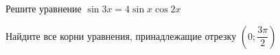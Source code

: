\begin{ex}
	\begin{condition}
		\begin{enumcols}[label=\asbuk*)]
			\item Решите уравнение \( \sin 3x =4\sin x\cos 2x \)
			\item Найдите все корни уравнения, принадлежащие отрезку \( \left(0;\dfrac{3\pi}{2}\right) \)
		\end{enumcols}
	\end{condition}
\end{ex}
